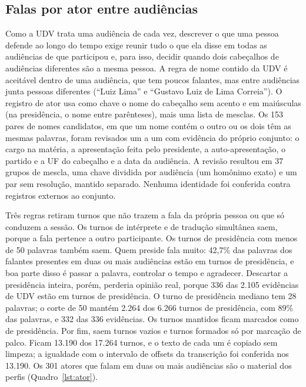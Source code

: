 \subsection{Falas por ator entre audiências}
\label{sec:metodo-atores}

Como a UDV trata uma audiência de cada vez, descrever o que uma pessoa defende ao longo do tempo exige
reunir tudo o que ela disse em todas as audiências de que participou e, para isso, decidir quando dois
cabeçalhos de audiências diferentes são a mesma pessoa. A regra de nome contido da UDV é
aceitável dentro de uma audiência, que tem poucos falantes, mas entre audiências junta pessoas
diferentes (``Luiz Lima'' e ``Gustavo Luiz de Lima Correia''). O registro de ator usa como chave o
nome do cabeçalho sem acento e em maiúsculas (na presidência, o nome entre parênteses), mais uma lista
de mesclas. Os 153 pares de nomes candidatos, em que um nome contém o outro ou os dois têm as mesmas
palavras, foram revisados um a um com evidência do próprio conjunto: o cargo na matéria, a
apresentação feita pelo presidente, a auto-apresentação, o partido e a UF do cabeçalho e a data da
audiência. A revisão resultou em 37 grupos de mescla, uma chave dividida por audiência (um homônimo
exato) e um par sem resolução, mantido separado. Nenhuma identidade foi conferida contra registros
externos ao conjunto.

Três regras retiram turnos que não trazem a fala da própria pessoa ou que só conduzem a sessão. Os
turnos de intérprete e de tradução simultânea saem, porque a fala pertence a outro participante. Os
turnos de presidência com menos de 50 palavras também saem. Quem preside fala muito: 42,7\% das
palavras dos falantes presentes em duas ou mais audiências estão em turnos de presidência, e boa parte
disso é passar a palavra, controlar o tempo e agradecer. Descartar a presidência inteira, porém,
perderia opinião real, porque 336 das 2.105 evidências de UDV estão em turnos de presidência. O turno
de presidência mediano tem 28 palavras; o corte de 50 mantém 2.264 dos 6.266 turnos de presidência,
com 89\% das palavras, e 332 das 336 evidências. Os turnos mantidos ficam marcados como de presidência.
Por fim, saem turnos vazios e turnos formados só por marcação de palco. Ficam 13.190 dos 17.264 turnos,
e o texto de cada um é copiado sem limpeza; a igualdade com o intervalo de offsets da transcrição foi
conferida nos 13.190. Os 301 atores que falam em duas ou mais audiências são o material dos perfis
(Quadro~\ref{lst:ator}).

